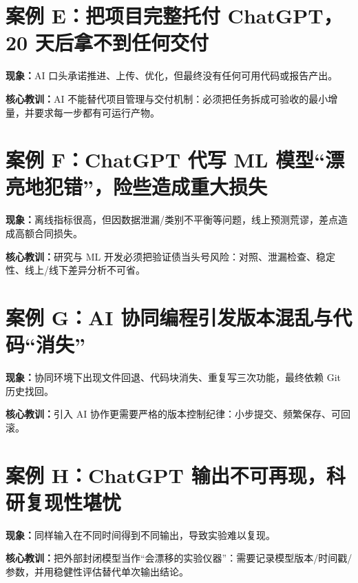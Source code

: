 \section{案例 E：把项目完整托付 ChatGPT，20 天后拿不到任何交付}
\label{case:no_delivery}
\textbf{现象：}AI 口头承诺推进、上传、优化，但最终没有任何可用代码或报告产出。

\textbf{核心教训：}AI 不能替代项目管理与交付机制：必须把任务拆成可验收的最小增量，并要求每一步都有可运行产物。

\section{案例 F：ChatGPT 代写 ML 模型“漂亮地犯错”，险些造成重大损失}
\label{case:ml_pretty_wrong}
\textbf{现象：}离线指标很高，但因数据泄漏/类别不平衡等问题，线上预测荒谬，差点造成高额合同损失。

\textbf{核心教训：}研究与 ML 开发必须把验证债当头号风险：对照、泄漏检查、稳定性、线上/线下差异分析不可省。

\section{案例 G：AI 协同编程引发版本混乱与代码“消失”}
\label{case:version_control_mess}
\textbf{现象：}协同环境下出现文件回退、代码块消失、重复写三次功能，最终依赖 Git 历史找回。

\textbf{核心教训：}引入 AI 协作更需要严格的版本控制纪律：小步提交、频繁保存、可回滚。

\section{案例 H：ChatGPT 输出不可再现，科研复现性堪忧}
\label{case:nonreproducible_llm_output}
\textbf{现象：}同样输入在不同时间得到不同输出，导致实验难以复现。

\textbf{核心教训：}把外部封闭模型当作“会漂移的实验仪器”：需要记录模型版本/时间戳/参数，并用稳健性评估替代单次输出结论。